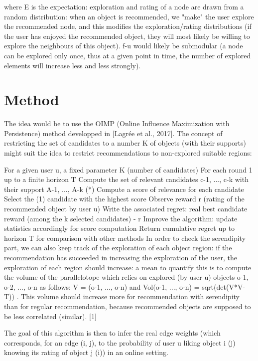 \documentclass{article}
\begin{document}
where E is the expectation: exploration and rating of a node are drawn from a random distribution: when an object is recommended, we "make" the user explore the recommended node, and this modifies the exploration/rating distributions (if the user has enjoyed the recommended object, they will most likely be willing to explore the neighbours of this object).
f-u would likely be submodular (a node can be explored only once, thus at a given point in time, the number of explored elements will increase less and less strongly).

\section{Method}

The idea would be to use the OIMP (Online Influence Maximization with Persistence) method developped in [Lagrée et al., 2017]. The concept of restricting the set of candidates to a number K of objects (with their supports) might suit the idea to restrict recommendations to non-explored suitable regions:

For a given user u, a fixed parameter K (number of candidates)
For each round 1 up to a finite horizon T
	Compute the set of relevant candidates c-1, ..., c-k with their support A-1, ..., A-k (*)
	Compute a score of relevance for each candidate
	Select the (1) candidate with the highest score
	Observe reward r (rating of the recommended object by user u)
	Write the associated regret: real best candidate reward (among the k selected candidates) - r
	Improve the algorithm: update statistics accordingly for score computation
Return cumulative regret up to horizon T for comparison with other methods
In order to check the serendipity part, we can also keep track of the exploration of each object region: if the recommendation has succeeded in increasing the exploration of the user, the exploration of each region should increase: a mean to quantify this is to compute the volume of the parallelotope which relies on explored (by user u) objects o-1, o-2, ..., o-n as follows: V = (o-1, ..., o-n) and Vol(o-1, ..., o-n) = sqrt(det(V*V-T)) . This volume should increase more for recommendation with serendipity than for regular recommendation, because recommended objects are supposed to be less correlated (similar). [1]

The goal of this algorithm is then to infer the real edge weights (which corresponds, for an edge (i, j), to the probability of user u liking object i (j) knowing its rating of object j (i)) in an online setting.
\end{document}
